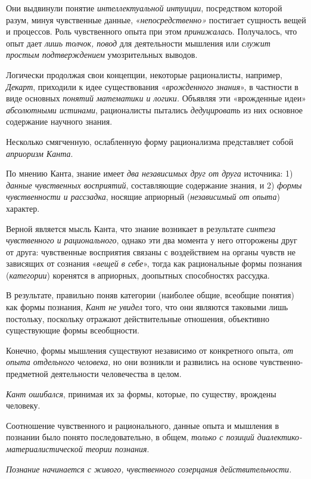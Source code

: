 \documentclass[a4paper,14pt,russian]{extreport}
\begin{document}
Они выдвинули понятие \emph{интеллектуальной интуиции}, посредством которой разум, минуя чувственные данные, «\emph{непосредственно»} постигает сущность вещей и процессов. Роль чувственного опыта при этом \emph{принижалась}. Получалось, что опыт дает \emph{лишь толчок, повод} для деятельности мышления или \emph{служит простым подтверждением} умозрительных выводов.

Логически продолжая свои концепции, некоторые рационалисты, например, \emph{Декарт}, приходили к идее существования «\emph{врожденного знания}», в частности в виде основных \emph{понятий математики и логики.} Объявляя эти «врожденные идеи» \emph{абсолютными истинами}, рационалисты пытались \emph{дедуцировать} из них основное содержание научного знания.

Несколько смягченную, ослабленную форму рационализма представляет собой \emph{априоризм Канта}.

По мнению Канта, знание имеет \emph{два независимых друг от друга} источника: 1) \emph{данные чувственных восприятий}, составляющие содержание знания, и 2) \emph{формы чувственности и рассзадка}, носящие априорный (\emph{независимый от опыта}) характер.

Верной является мысль Канта, что знание возникает в результате \emph{синтеза чувственного и рационального}, однако эти два момента у него отгорожены друг от друга: чувственные восприятия связаны с воздействием на органы чувств не зависящих от сознания «\emph{вещей в себе}», тогда как рациональные формы познания (\emph{категории}) коренятся в априорных, доопытных способностях рассудка.

В результате, правильно поняв категории (наиболее общие, всеобщие понятия) как формы познания, \emph{Кант не увидел} того, что они являются таковыми лишь постольку, поскольку отражают действительные отношения, объективно существующие формы всеобщности.

Конечно, формы мышления существуют независимо от конкретного опыта, \emph{от опыта отдельного человека}, но они возникли и развились на основе чувственно-предметной деятельности человечества в целом.

\emph{Кант ошибался}, принимая их за формы, которые, по существу, врождены человеку.

Соотношение чувственного и рационального, данные опыта и мышления в познании было понято последовательно, в общем, \emph{только с позиций диалектико-материалистической теории познания}.

\emph{Познание начинается с живого, чувственного созерцания действительности.}
\end{document}
